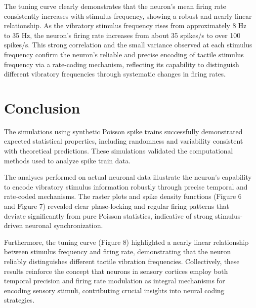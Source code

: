 \documentclass{article}
\begin{document}
The tuning curve clearly demonstrates that the neuron's mean firing rate consistently increases with stimulus frequency, showing a robust and nearly linear relationship. As the vibratory stimulus frequency rises from approximately 8 Hz to 35 Hz, the neuron's firing rate increases from about 35 spikes/s to over 100 spikes/s. This strong correlation and the small variance observed at each stimulus frequency confirm the neuron’s reliable and precise encoding of tactile stimulus frequency via a rate-coding mechanism, reflecting its capability to distinguish different vibratory frequencies through systematic changes in firing rates.


\section{Conclusion}

The simulations using synthetic Poisson spike trains successfully demonstrated expected statistical properties, including randomness and variability consistent with theoretical predictions. These simulations validated the computational methods used to analyze spike train data.

The analyses performed on actual neuronal data illustrate the neuron's capability to encode vibratory stimulus information robustly through precise temporal and rate-coded mechanisms. The raster plots and spike density functions (Figure 6 and Figure 7) revealed clear phase-locking and regular firing patterns that deviate significantly from pure Poisson statistics, indicative of strong stimulus-driven neuronal synchronization. 

Furthermore, the tuning curve (Figure 8) highlighted a nearly linear relationship between stimulus frequency and firing rate, demonstrating that the neuron reliably distinguishes different tactile vibration frequencies. Collectively, these results reinforce the concept that neurons in sensory cortices employ both temporal precision and firing rate modulation as integral mechanisms for encoding sensory stimuli, contributing crucial insights into neural coding strategies.
\end{document}
